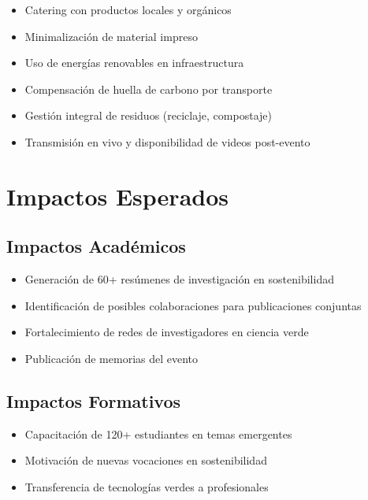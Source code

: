 \documentclass[12pt,a4paper]{article}
\begin{document}
\begin{itemize}[label={\textcolor{verdelimpio}{\textbullet}}]
  \item Catering con productos locales y orgánicos
  \item Minimalización de material impreso
  \item Uso de energías renovables en infraestructura
  \item Compensación de huella de carbono por transporte
  \item Gestión integral de residuos (reciclaje, compostaje)
  \item Transmisión en vivo y disponibilidad de videos post-evento
\end{itemize}

\section{Impactos Esperados}

\subsection{Impactos Académicos}

\begin{itemize}[label={\textcolor{verdeosc}{\textbullet}}]
  \item Generación de 60+ resúmenes de investigación en sostenibilidad
  \item Identificación de posibles colaboraciones para publicaciones conjuntas
  \item Fortalecimiento de redes de investigadores en ciencia verde
  \item Publicación de memorias del evento
\end{itemize}

\subsection{Impactos Formativos}

\begin{itemize}[label={\textcolor{verdeosc}{\textbullet}}]
  \item Capacitación de 120+ estudiantes en temas emergentes
  \item Motivación de nuevas vocaciones en sostenibilidad
  \item Transferencia de tecnologías verdes a profesionales
\end{itemize}
\end{document}
